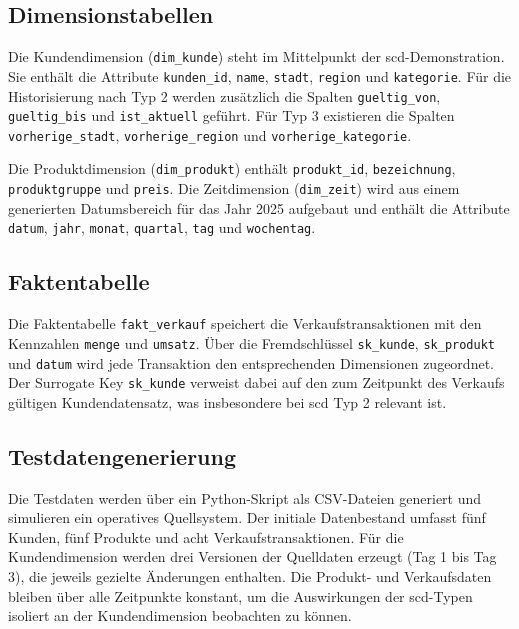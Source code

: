 \documentclass[a4paper,11pt]{article}
\begin{document}
\subsection{Dimensionstabellen}
Die Kundendimension (\texttt{dim\_kunde}) steht im Mittelpunkt der \gls{scd}-Demonstration. 
Sie enthält die Attribute \texttt{kunden\_id}, \texttt{name}, \texttt{stadt}, \texttt{region} 
und \texttt{kategorie}. Für die Historisierung nach Typ 2 werden zusätzlich die Spalten 
\texttt{gueltig\_von}, \texttt{gueltig\_bis} und \texttt{ist\_aktuell} geführt. Für Typ 3 
existieren die Spalten \texttt{vorherige\_stadt}, \texttt{vorherige\_region} und \texttt{vorherige\_kategorie}.

Die Produktdimension (\texttt{dim\_produkt}) enthält \texttt{produkt\_id}, \texttt{bezeichnung}, 
\texttt{produktgruppe} und \texttt{preis}. Die Zeitdimension (\texttt{dim\_zeit}) wird aus einem 
generierten Datumsbereich für das Jahr 2025 aufgebaut und enthält die Attribute \texttt{datum}, 
\texttt{jahr}, \texttt{monat}, \texttt{quartal}, \texttt{tag} und \texttt{wochentag}.

\subsection{Faktentabelle}
Die Faktentabelle \texttt{fakt\_verkauf} speichert die Verkaufstransaktionen mit den Kennzahlen \texttt{menge} 
und \texttt{umsatz}. Über die Fremdschlüssel \texttt{sk\_kunde}, \texttt{sk\_produkt} und \texttt{datum} wird 
jede Transaktion den entsprechenden Dimensionen zugeordnet. Der Surrogate Key \texttt{sk\_kunde} verweist dabei 
auf den zum Zeitpunkt des Verkaufs gültigen Kundendatensatz, was insbesondere bei \gls{scd} Typ 2 relevant ist.

\subsection{Testdatengenerierung}
Die Testdaten werden über ein Python-Skript als CSV-Dateien generiert und simulieren ein operatives Quellsystem. 
Der initiale Datenbestand umfasst fünf Kunden, fünf Produkte und acht Verkaufstransaktionen. Für die Kundendimension 
werden drei Versionen der Quelldaten erzeugt (Tag 1 bis Tag 3), die jeweils gezielte Änderungen enthalten. 
Die Produkt- und Verkaufsdaten bleiben über alle Zeitpunkte konstant, um die Auswirkungen der \gls{scd}-Typen 
isoliert an der Kundendimension beobachten zu können.

\end{document}

